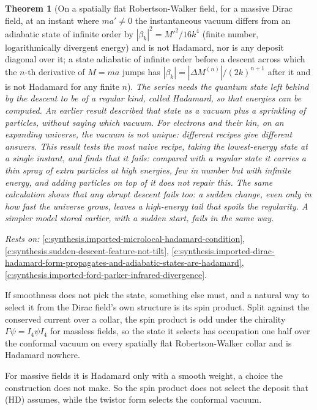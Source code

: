\documentclass[11pt]{article}
\newtheorem{theorem}{Theorem}[section]
\theoremstyle{definition}
\theoremstyle{plain}
\begin{document}
\begin{theorem}[On a spatially flat Robertson-Walker field, for a massive Dirac field, at an instant where $ma' \neq 0$ the instantaneous vacuum differs from an adiabatic state of infinite order by $|\beta_{k}|^{2} = M'^{2}/16k^{4}$ (finite number, logarithmically divergent energy) and is not Hadamard, nor is any deposit diagonal over it; a state adiabatic of infinite order before a descent across which the $n$-th derivative of $M = ma$ jumps has $|\beta_{k}| = |\Delta M^{(n)}|/(2k)^{n+1}$ after it and is not Hadamard for any finite $n$]\label{c:synthesis.massive-dirac-instantaneous-vacuum-and-non-smooth-descents-are-not-hadamard}
The series needs the quantum state left behind by the descent to be of a regular kind, called Hadamard, so that energies can be computed. An earlier result described that state as a vacuum plus a sprinkling of particles, without saying which vacuum. For electrons and their kin, on an expanding universe, the vacuum is not unique: different recipes give different answers. This result tests the most naive recipe, taking the lowest-energy state at a single instant, and finds that it fails: compared with a regular state it carries a thin spray of extra particles at high energies, few in number but with infinite energy, and adding particles on top of it does not repair this. The same calculation shows that any abrupt descent fails too: a sudden change, even only in how fast the universe grows, leaves a high-energy tail that spoils the regularity. A simpler model stored earlier, with a sudden start, fails in the same way.
\end{theorem}
\noindent\emph{Rests on:} \ref{c:synthesis.imported-microlocal-hadamard-condition}, \ref{c:synthesis.sudden-descent-feature-not-tilt}, \ref{c:synthesis.imported-dirac-hadamard-form-propagates-and-adiabatic-states-are-hadamard}, \ref{c:synthesis.imported-ford-parker-infrared-divergence}.

If smoothness does not pick the state, something else must, and a natural way to select it from the Dirac field's own structure is its spin product. Split against the conserved current over a collar, the spin product is odd under the chirality $\Gamma\psi = I_{4}\psi I_{4}$ for massless fields, so the state it selects has occupation one half over the conformal vacuum on every spatially flat Robertson-Walker collar and is Hadamard nowhere.

For massive fields it is Hadamard only with a smooth weight, a choice the construction does not make. So the spin product does not select the deposit that (HD) assumes, while the twistor form selects the conformal vacuum.
\end{document}
